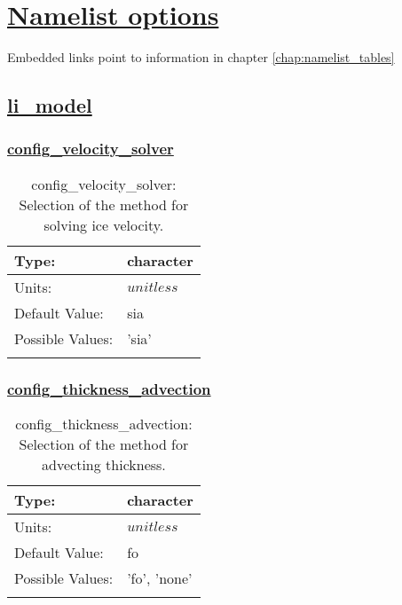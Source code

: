 \chapter[Namelist options]{\hyperref[chap:namelist_tables]{Namelist options}}
\label{chap:namelist_sections}
Embedded links point to information in chapter \ref{chap:namelist_tables}
\section[li\_model]{\hyperref[sec:nm_tab_li_model]{li\_model}}
\label{sec:nm_sec_li_model}
\subsection[config\_velocity\_solver]{\hyperref[sec:nm_tab_li_model]{config\_velocity\_solver}}
\label{subsec:nm_sec_config_velocity_solver}
\begin{center}
\begin{longtable}{| p{2.0in} | p{4.0in} |}
    \hline
    Type: & character \\
    \hline
    Units: & $unitless$ \\
    \hline
    Default Value: & sia \\
    \hline
    Possible Values: & 'sia' \\
    \hline
    \caption{config\_velocity\_solver: Selection of the method for solving ice velocity.}
\end{longtable}
\end{center}
\subsection[config\_thickness\_advection]{\hyperref[sec:nm_tab_li_model]{config\_thickness\_advection}}
\label{subsec:nm_sec_config_thickness_advection}
\begin{center}
\begin{longtable}{| p{2.0in} | p{4.0in} |}
    \hline
    Type: & character \\
    \hline
    Units: & $unitless$ \\
    \hline
    Default Value: & fo \\
    \hline
    Possible Values: & 'fo', 'none' \\
    \hline
    \caption{config\_thickness\_advection: Selection of the method for advecting thickness.}
\end{longtable}
\end{center}
